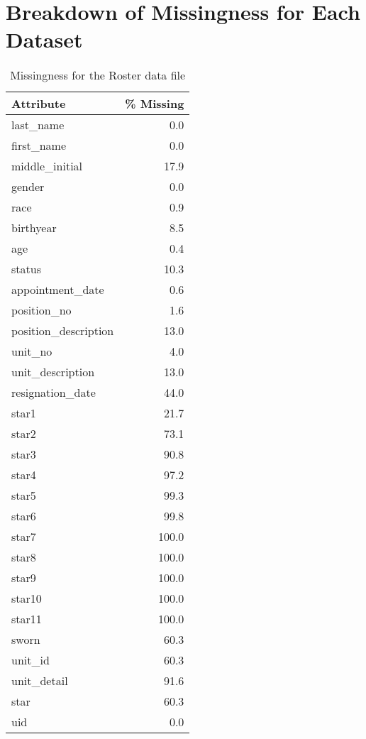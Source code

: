 \section{Breakdown of Missingness for Each Dataset}\label{sec:missingness}

\begin{table}[t!]
\caption{Missingness for the Roster data file}
\centering 
\begin{tabular}{lr}
\toprule
           Attribute &  \% Missing \\
\midrule
           last\_name &        0.0 \\
          first\_name &        0.0 \\
      middle\_initial &       17.9 \\
              gender &        0.0 \\
                race &        0.9 \\
           birthyear &        8.5 \\
                 age &        0.4 \\
              status &       10.3 \\
    appointment\_date &        0.6 \\
         position\_no &        1.6 \\
position\_description &       13.0 \\
             unit\_no &        4.0 \\
    unit\_description &       13.0 \\
    resignation\_date &       44.0 \\
               star1 &       21.7 \\
               star2 &       73.1 \\
               star3 &       90.8 \\
               star4 &       97.2 \\
               star5 &       99.3 \\
               star6 &       99.8 \\
               star7 &      100.0 \\
               star8 &      100.0 \\
               star9 &      100.0 \\
              star10 &      100.0 \\
              star11 &      100.0 \\
               sworn &       60.3 \\
             unit\_id &       60.3 \\
         unit\_detail &       91.6 \\
                star &       60.3 \\
                 uid &        0.0 \\
\bottomrule
\end{tabular}
\end{table}

